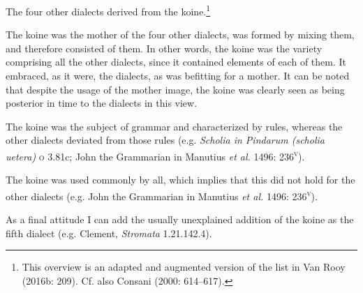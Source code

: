 \setcounter{listWWNumxxxvleveli}{0}
\begin{listWWNumxxxvleveli}
\item 
\begin{styleListParagraph}
The four other dialects derived from the koine.\footnote{ This overview is an adapted and augmented version of the list in Van Rooy (2016b: 209). Cf. also Consani (2000: 614–617).}
\end{styleListParagraph}
\item 
\begin{styleListParagraph}
The koine was the mother of the four other dialects, was formed by mixing them, and therefore consisted of them. In other words, the koine was the variety comprising all the other dialects, since it contained elements of each of them. It embraced, as it were, the dialects, as was befitting for a mother. It can be noted that despite the usage of the mother image, the koine was clearly seen as being posterior in time to the dialects in this view.
\end{styleListParagraph}
\item 
\begin{styleListParagraph}
The koine was the subject of grammar and characterized by rules, whereas the other dialects deviated from those rules (e.g. \textit{Scholia in Pindarum (scholia uetera)} \textsc{o} 3.81c; John the Grammarian in Manutius \textit{et al.} 1496: 236\textsc{\textsuperscript{v}}).
\end{styleListParagraph}
\item 
\begin{styleListParagraph}
The koine was used commonly by all, which implies that this did not hold for the other dialects (e.g. John the Grammarian in Manutius \textit{et al.} 1496: 236\textsc{\textsuperscript{v}}).
\end{styleListParagraph}
\item 
\begin{styleListParagraph}
As a final attitude I can add the usually unexplained addition of the koine as the fifth dialect (e.g. Clement, \textit{Stromata} 1.21.142.4).
\end{styleListParagraph}
\end{listWWNumxxxvleveli}
